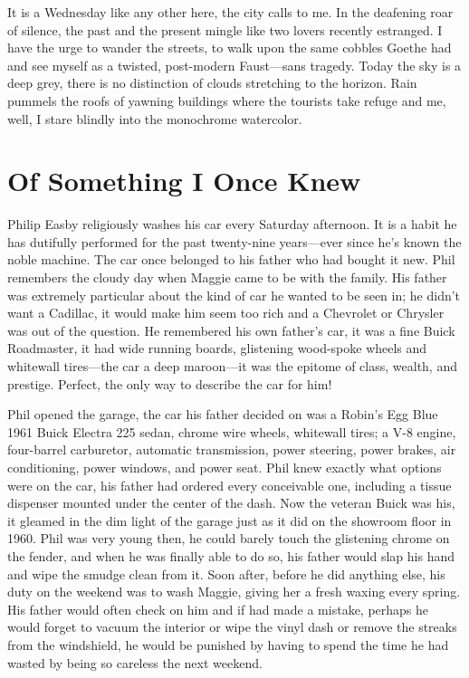It is a Wednesday like any other here, the city calls to me. In the
deafening roar of silence, the past and the present mingle like two
lovers recently estranged. I have the urge to wander the streets, to
walk upon the same cobbles Goethe had and see myself as a twisted,
post-modern Faust---sans tragedy. Today the sky is a deep grey, there is
no distinction of clouds stretching to the horizon. Rain pummels the
roofs of yawning buildings where the tourists take refuge and me, well,
I stare blindly into the monochrome watercolor.

\chapter{Of Something I Once Knew}\label{of-something-i-once-knew}

Philip Easby religiously washes his car every Saturday afternoon. It is
a habit he has dutifully performed for the past twenty-nine years---ever
since he's known the noble machine. The car once belonged to his father
who had bought it new. Phil remembers the cloudy day when Maggie came to
be with the family. His father was extremely particular about the kind
of car he wanted to be seen in; he didn't want a Cadillac, it would make
him seem too rich and a Chevrolet or Chrysler was out of the question.
He remembered his own father's car, it was a fine Buick Roadmaster, it
had wide running boards, glistening wood-spoke wheels and whitewall
tires---the car a deep maroon---it was the epitome of class, wealth, and
prestige. Perfect, the only way to describe the car for him!

Phil opened the garage, the car his father decided on was a Robin's Egg
Blue 1961 Buick Electra 225 sedan, chrome wire wheels, whitewall tires;
a V-8 engine, four-barrel carburetor, automatic transmission, power
steering, power brakes, air conditioning, power windows, and power seat.
Phil knew exactly what options were on the car, his father had ordered
every conceivable one, including a tissue dispenser mounted under the
center of the dash. Now the veteran Buick was his, it gleamed in the dim
light of the garage just as it did on the showroom floor in 1960. Phil
was very young then, he could barely touch the glistening chrome on the
fender, and when he was finally able to do so, his father would slap his
hand and wipe the smudge clean from it. Soon after, before he did
anything else, his duty on the weekend was to wash Maggie, giving her a
fresh waxing every spring. His father would often check on him and if
had made a mistake, perhaps he would forget to vacuum the interior or
wipe the vinyl dash or remove the streaks from the windshield, he would
be punished by having to spend the time he had wasted by being so
careless the next weekend.

